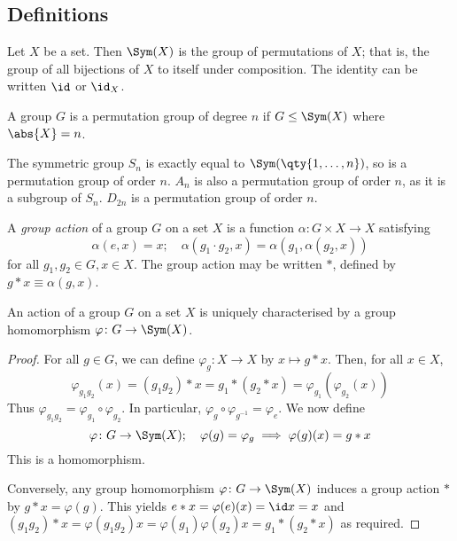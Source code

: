\subsection{Definitions}
\begin{definition}
	Let \( X \) be a set.
	Then \( \Sym(X) \) is the group of permutations of \( X \); that is, the group of all bijections of \( X \) to itself under composition.
	The identity can be written \( \id \) or \( \id_X \).
\end{definition}
\begin{definition}
	A group \( G \) is a permutation group of degree \( n \) if \( G \leq \Sym(X) \) where \( \abs{X} = n \).
\end{definition}
\begin{example}
	The symmetric group \( S_n \) is exactly equal to \( \Sym(\qty{1, \dots, n}) \), so is a permutation group of order \( n \).
	\( A_n \) is also a permutation group of order \( n \), as it is a subgroup of \( S_n \).
	\( D_{2n} \) is a permutation group of order \( n \).
\end{example}
\begin{definition}
	A \textit{group action} of a group \( G \) on a set \( X \) is a function \( \alpha \colon G \times X \to X \) satisfying
	\[ \alpha(e, x) = x;\quad \alpha(g_1 \cdot g_2, x) = \alpha(g_1, \alpha(g_2, x)) \]
	for all \( g_1, g_2 \in G, x \in X \).
	The group action may be written \( \ast \), defined by \( g \ast x \equiv \alpha(g,x) \).
\end{definition}
\begin{proposition}
	An action of a group \( G \) on a set \( X \) is uniquely characterised by a group homomorphism \( \varphi \colon G \to \Sym(X) \).
\end{proposition}
\begin{proof}
	For all \( g \in G \), we can define \( \varphi_g \colon X \to X \) by \( x \mapsto g \ast x \).
	Then, for all \( x \in X \),
	\[ \varphi_{g_1 g_2} (x) = (g_1 g_2) \ast x = g_1 \ast (g_2 \ast x) = \varphi_{g_1}(\varphi_{g_2}(x)) \]
	Thus \( \varphi_{g_1 g_2} = \varphi_{g_1} \circ \varphi_{g_2} \).
	In particular, \( \varphi_g \circ \varphi_{g^{-1}} = \varphi_e \).
	We now define
	\[ \varphi \colon G \to \Sym(X);\quad \varphi(g) = \varphi_g \implies \varphi(g)(x) = g \ast x \]
	This is a homomorphism.

	Conversely, any group homomorphism \( \varphi \colon G \to \Sym(X) \) induces a group action \( \ast \) by \( g \ast x = \varphi(g) \).
	This yields \( e \ast x = \varphi(e)(x) = \id x = x \) and \( (g_1 g_2) \ast x = \varphi(g_1 g_2) x = \varphi(g_1) \varphi(g_2) x = g_1 \ast (g_2 \ast x) \) as required.
\end{proof}
